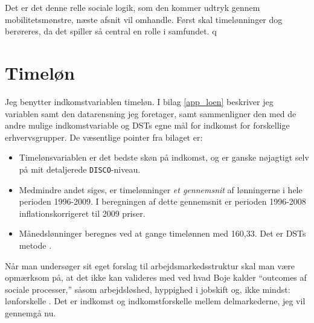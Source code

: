 Det er det denne relle sociale logik, som den kommer udtryk gennem mobilitetsmønstre, næste afsnit vil omhandle. Først skal timelønninger dog berøreres, da det spiller så central en rolle i samfundet. q



\section{Timeløn}

Jeg benytter indkomstvariablen timeløn. I bilag \ref{app_loen} beskriver jeg variablen samt den datarensning jeg foretager, samt sammenligner den med de andre mulige indkomstvariable og DSTs egne mål for indkomst for forskellige erhvervsgrupper. De væsentlige pointer fra bilaget er:
%
 \begin{itemize}
  \itemsep -0.5em
  	\item Timelønsvariablen er det bedste skøn på indkomst, og er ganske nøjagtigt selv på mit detaljerede \texttt{DISCO}-niveau.
  	\item Medmindre andet siges, er timelønninger \emph{et gennemsnit} af lønningerne i hele perioden 1996-2009. I beregningen af dette gennemsnit er perioden 1996-2008 inflationskorrigeret til 2009 priser.
  	\item Månedslønninger beregnes ved at gange timelønnen med 160,33. Det er DSTs metode \parencite[32]{DST2009}.
 \end{itemize}
%
Når man undersøger sit eget forslag til arbejdsmarkedsstruktur skal man være opmærksom på, at det ikke kan valideres med ved hvad Boje kalder “outcomes af sociale processer,” såsom arbejdsløshed, hyppighed i jobskift og, ikke mindst: lønforskelle \parencite[28]{Boje1985}. Det er indkomst og indkomstforskelle mellem delmarkederne, jeg vil gennemgå nu. 

